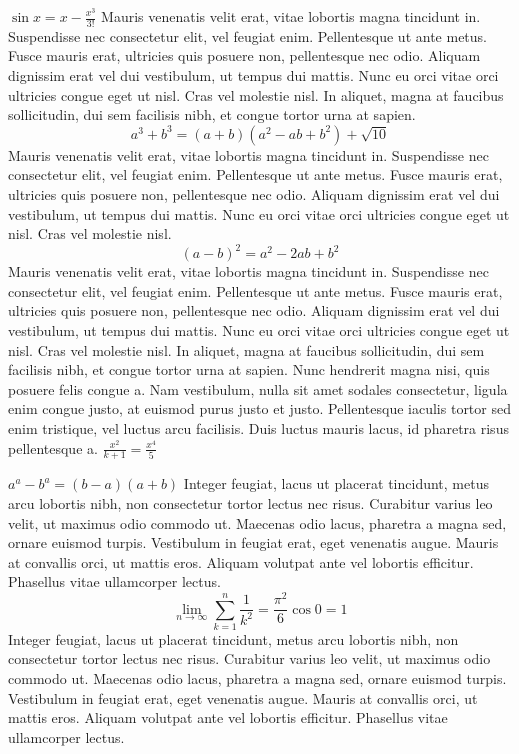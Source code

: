 \documentclass{article}
\begin{document}
\(
\sin {x}  =  x -\frac{x^{3}}{3!}
\)
Mauris venenatis velit erat, vitae lobortis magna tincidunt in. Suspendisse nec consectetur elit, vel feugiat enim. Pellentesque ut ante metus. Fusce mauris erat, ultricies quis posuere non, pellentesque nec odio. Aliquam dignissim erat vel dui vestibulum, ut tempus dui mattis. Nunc eu orci vitae orci ultricies congue eget ut nisl. Cras vel molestie nisl. In aliquet, magna at faucibus sollicitudin, dui sem facilisis nibh, et congue tortor urna at sapien.
\[ a^{3} + b^{3} = (a+b)(a^{2}-ab+b^{2}) + \sqrt{10} \]
Mauris venenatis velit erat, vitae lobortis magna tincidunt in. Suspendisse nec consectetur elit, vel feugiat enim. Pellentesque ut ante metus. Fusce mauris erat, ultricies quis posuere non, pellentesque nec odio. Aliquam dignissim erat vel dui vestibulum, ut tempus dui mattis. Nunc eu orci vitae orci ultricies congue eget ut nisl. Cras vel molestie nisl.
\begin{equation}
(a-b)^{2}=a^{2}-2ab+b^{2} 
\end{equation}
Mauris venenatis velit erat, vitae lobortis magna tincidunt in. Suspendisse nec consectetur elit, vel feugiat enim. Pellentesque ut ante metus. Fusce mauris erat, ultricies quis posuere non, pellentesque nec odio. Aliquam dignissim erat vel dui vestibulum, ut tempus dui mattis. Nunc eu orci vitae orci ultricies congue eget ut nisl. Cras vel molestie nisl. In aliquet, magna at faucibus sollicitudin, dui sem facilisis nibh, et congue tortor urna at sapien.
Nunc hendrerit magna nisi, quis posuere felis congue a. Nam vestibulum, nulla sit amet sodales consectetur, ligula enim congue justo, at euismod purus justo et justo. Pellentesque iaculis tortor sed enim tristique, vel luctus arcu facilisis. Duis luctus mauris lacus, id pharetra risus pellentesque a.
$\frac{ x^{2} }{ k+1 } = \frac{ x^{4} }{ 5 }$

\begin{math}
	a^{a}-b^{a} = (b - a)(a + b)
\end{math}
 Integer feugiat, lacus ut placerat tincidunt, metus arcu lobortis nibh, non consectetur tortor lectus nec risus. Curabitur varius leo velit, ut maximus odio commodo ut. Maecenas odio lacus, pharetra a magna sed, ornare euismod turpis. Vestibulum in feugiat erat, eget venenatis augue. Mauris at convallis orci, ut mattis eros. Aliquam volutpat ante vel lobortis efficitur. Phasellus vitae ullamcorper lectus.
$$
\lim_{n \to \infty}
\sum_{k=1}^n \frac{1}{k^2}
= \frac{\pi^2}{6} \cos{0} = 1
$$
 Integer feugiat, lacus ut placerat tincidunt, metus arcu lobortis nibh, non consectetur tortor lectus nec risus. Curabitur varius leo velit, ut maximus odio commodo ut. Maecenas odio lacus, pharetra a magna sed, ornare euismod turpis. Vestibulum in feugiat erat, eget venenatis augue. Mauris at convallis orci, ut mattis eros. Aliquam volutpat ante vel lobortis efficitur. Phasellus vitae ullamcorper lectus.
\end{document}
